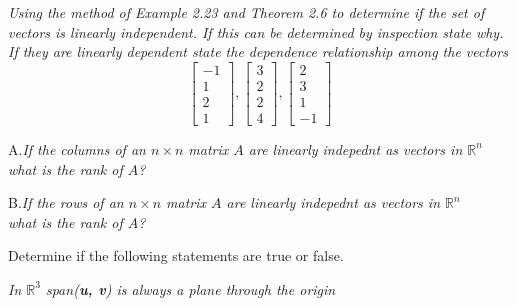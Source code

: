 \documentclass[12pt,letterpaper]{hmcpset}
\begin{document}
\begin{solution}

\end{solution}

\newpage

\begin{problem}[2.3.28]
\textit{Using the method of Example 2.23 and Theorem 2.6 to determine if the set of vectors is linearly independent. If this can be determined by inspection state why. If they are linearly dependent state the dependence relationship among the vectors}
$$\begin{bmatrix}
-1\\1\\2\\1
\end{bmatrix} \phantom{	},
\begin{bmatrix}
3\\2\\2\\4
\end{bmatrix} \phantom{	},
\begin{bmatrix}
2\\3\\1\\-1
\end{bmatrix} \phantom{	}
$$
\end{problem}

\begin{solution}

\end{solution}

\newpage

\begin{problem}[2.3.42]
A.\textit{If the columns of an $n\times n$ matrix $A$ are linearly indepednt as vectors in $\mathbb{R}^n$\\ \indent \phantom{phantom} what is the rank of $A$?}

\indent B.\textit{If the rows of an $n\times n$ matrix $A$ are linearly indepednt as vectors in $\mathbb{R}^n$\\ \indent \phantom{phantom} what is the rank of $A$?}
\end{problem}

\begin{solution}

\end{solution}

\newpage

\begin{center}
Determine if the following statements are true or false. 
\end{center}
\begin{problem}[Ch 2.1f]
\textit{In $\mathbb{R}^3$ span(\textbf{u, v}) is always a plane through the origin} 
\end{problem}
\end{document}
